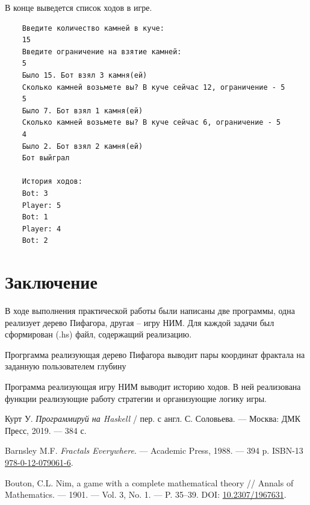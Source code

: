 \documentclass[10pt,a4paper,final]{article} %
\begin{document}
В конце выведется список ходов в игре.

\begin{lstlisting}
	Введите количество камней в куче:
	15
	Введите ограничение на взятие камней:
	5
	Было 15. Бот взял 3 камня(ей)
	Сколько камней возьмете вы? В куче сейчас 12, ограничение - 5
	5
	Было 7. Бот взял 1 камня(ей)
	Сколько камней возьмете вы? В куче сейчас 6, ограничение - 5
	4
	Было 2. Бот взял 2 камня(ей)
	Бот выйграл
	
	История ходов:
	Bot: 3
	Player: 5
	Bot: 1
	Player: 4
	Bot: 2
\end{lstlisting}


\newpage

\section* {Заключение}
В ходе выполнения практической работы были написаны две программы, одна реализует дерево Пифагора, другая -- игру НИМ. Для каждой задачи был сформирован (.hs) файл, содержащий реализацию.

Прогргамма реализующая дерево Пифагора выводит пары координат фрактала на заданную пользователем глубину

Программа реализующая игру НИМ выводит историю ходов. В ней реализована функции реализующие работу стратегии и организующие логику игры. 

\newpage

\begin{thebibliography}{99}

	Курт У. \textit{Программируй на Haskell} / пер. с англ. С. Соловьева. — Москва: ДМК Пресс, 2019. — 384 с.
	
	Barnsley M.F. \textit{Fractals Everywhere}. — Academic Press, 1988. — 394 p. ISBN-13 \href{https://isbnsearch.org/isbn/9780120790616}{978-0-12-079061-6}.

	
	Bouton, C.L. Nim, a game with a complete mathematical theory // Annals of Mathematics. — 1901. — Vol. 3, No. 1. — P. 35–39. DOI: \href{https://doi.org/10.2307/1967631}{10.2307/1967631}.

\end{thebibliography}

\end{document}
